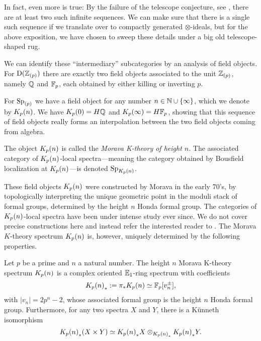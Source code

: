 \begin{remark}
    In fact, even more is true: By the failure of the telescope conjecture, see \cite{burklund-hahn-levy-schlank_23}, there are at least two such infinite sequences. We can make sure that there is a single such sequence if we translate over to compactly generated $\otimes$-ideals, but for the above exposition, we have chosen to sweep these details under a big old telescope-shaped rug.
\end{remark}

We can identify these ``intermediary'' subcategories by an analysis of field objects. For $\mathrm{D}(\mathbb{Z}_{(p)})$ there are exactly two field objects associated to the unit $\mathbb{Z}_{(p)}$, namely $\mathbb{Q}$ and $\mathbb{F}_p$, each obtained by either killing or inverting $p$. 

For $\mathrm{Sp}_{(p)}$ we have a field object for any number $n\in \mathbb{N}\cup \{\infty\}$, which we denote by ${K_p(n)}$. We have $K_p(0)=H\mathbb{Q}$ and $K_p(\infty) = H\mathbb{F}_p$, showing that this sequence of field objects really forms an interpolation between the two field objects coming from algebra. 

\begin{notation}
    The object ${K_p(n)}$ is called the \emph{Morava K-theory of height $n$}. The associated category of ${K_p(n)}$-local spectra---meaning the category obtained by Bousfield localization at ${K_p(n)}$---is denoted $\mathrm{Sp}_{{K_p(n)}}$. 
\end{notation}

These field objects ${K_p(n)}$ were constructed by Morava in the early 70's, by topologically interpreting the unique geometric point in the moduli stack of formal groups, determined by the height $n$ Honda formal group. The categories of ${K_p(n)}$-local spectra have been under intense study ever since. We do not cover precise constructions here and instead refer the interested reader to \cite{hovey-strickland_99}. The Morava $K$-theory spectrum ${K_p(n)}$ is, however, uniquely determined by the following properties. 

\begin{proposition}
    \label{ch0:prop:properties-of-K(n)}
    Let $p$ be a prime and $n$ a natural number. The height $n$ Morava K-theory spectrum ${K_p(n)}$ is a complex oriented $\mathbb{E}_1$-ring spectrum with coefficients 
    \[{K_p(n)}_*:=\pi_* {K_p(n)} \simeq \mathbb{F}_p[v_n^{\pm}],\]
    with $|v_n|=2p^n-2$, whose associated formal group is the height $n$ Honda formal group. Furthermore, for any two spectra $X$ and $Y$, there is a Künneth isomorphism 
    \[{K_p(n)}_*(X\times Y)\simeq {K_p(n)}_*X\otimes_{{K_p(n)}_*} {K_p(n)}_*Y.\]
\end{proposition}

